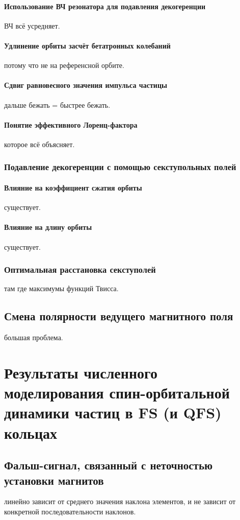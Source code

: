 \documentclass{report}
\begin{document}
\subsubsection{Использование ВЧ резонатора для подавления декогеренции}
ВЧ всё усредняет.
\subsubsection{Удлинение орбиты засчёт бетатронных колебаний}
потому что не на референсной орбите.
\subsubsection{Сдвиг равновесного значения импульса частицы}
дальше бежать = быстрее бежать.
\subsubsection{Понятие эффективного Лоренц-фактора}
которое всё объясняет.

\subsection{Подавление декогеренции с помощью секступольных полей}
\subsubsection{Влияние на коэффициент сжатия орбиты}
существует.
\subsubsection{Влияние на длину орбиты}
существует.
\subsection{Оптимальная расстановка секступолей}
там где максимумы функций Твисса.

\section{Смена полярности ведущего магнитного поля}
большая проблема.

\chapter{Результаты численного моделирования спин-орбитальной динамики частиц в FS (и QFS) кольцах}

\section{Фальш-сигнал, связанный с неточностью установки магнитов}
линейно зависит от среднего значения наклона элементов, и не зависит от конкретной последовательности наклонов.
\end{document}
